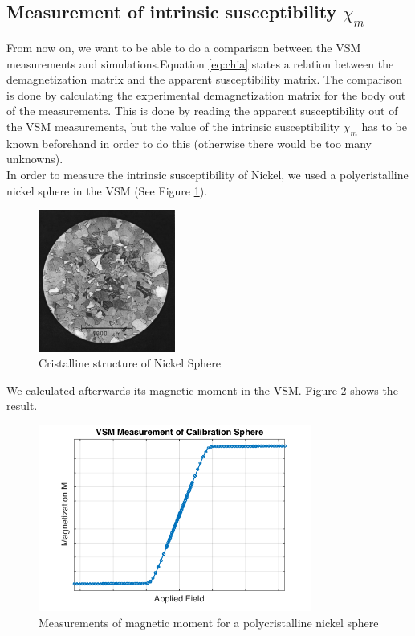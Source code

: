 \subsection{Measurement of intrinsic susceptibility $\chi_m$}


From now on, we want to be able to do a comparison between the VSM measurements and simulations.Equation \ref{eq:chia} states a relation between the demagnetization matrix and the apparent susceptibility matrix. The comparison is done by calculating the experimental demagnetization matrix for the body out of the measurements. This is done by reading the apparent susceptibility out of the VSM measurements, but the value of the intrinsic susceptibility $\chi_m$ has to be known beforehand in order to do this (otherwise there would be too many unknowns).\\

In order to measure the intrinsic susceptibility of Nickel, we used a polycristalline nickel sphere in the VSM (See Figure \ref{fig:NiSphere}).\\

\begin{figure}[ht]
	\centering
  \includegraphics[width=0.4\textwidth]{Pictures/NiSphere.png}
	\caption{Cristalline structure of Nickel Sphere}
	\label{fig:NiSphere}
\end{figure}

We calculated afterwards its magnetic moment in the VSM. Figure \ref{fig:VSMNiSphere} shows the result.\\

\begin{figure}[ht]
	\centering
  \includegraphics[width=0.8\textwidth]{Pictures/VSMNiSphere.png}
	\caption{Measurements of magnetic moment for a polycristalline nickel sphere}
	\label{fig:VSMNiSphere}
\end{figure}

